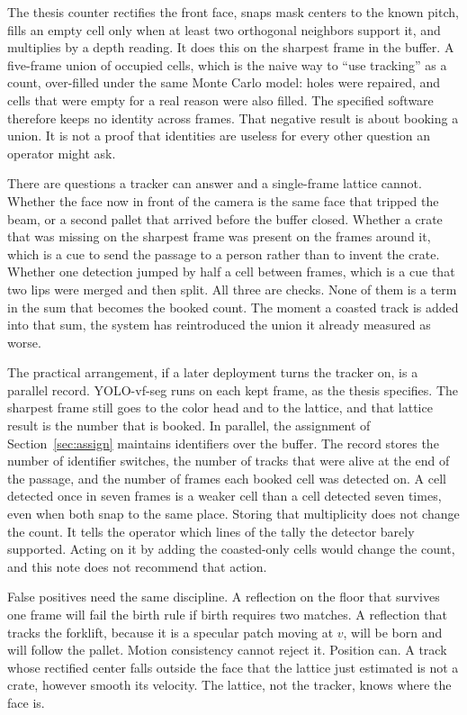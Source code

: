\documentclass[11pt,a4paper]{article}
\begin{document}
The thesis counter rectifies the front face, snaps mask centers to the known pitch, fills an empty cell only when at least two orthogonal neighbors support it, and multiplies by a depth reading. It does this on the sharpest frame in the buffer. A five-frame union of occupied cells, which is the naive way to ``use tracking'' as a count, over-filled under the same Monte Carlo model: holes were repaired, and cells that were empty for a real reason were also filled. The specified software therefore keeps no identity across frames. That negative result is about booking a union. It is not a proof that identities are useless for every other question an operator might ask.

There are questions a tracker can answer and a single-frame lattice cannot. Whether the face now in front of the camera is the same face that tripped the beam, or a second pallet that arrived before the buffer closed. Whether a crate that was missing on the sharpest frame was present on the frames around it, which is a cue to send the passage to a person rather than to invent the crate. Whether one detection jumped by half a cell between frames, which is a cue that two lips were merged and then split. All three are checks. None of them is a term in the sum that becomes the booked count. The moment a coasted track is added into that sum, the system has reintroduced the union it already measured as worse.

The practical arrangement, if a later deployment turns the tracker on, is a parallel record. YOLO-vf-seg runs on each kept frame, as the thesis specifies. The sharpest frame still goes to the color head and to the lattice, and that lattice result is the number that is booked. In parallel, the assignment of Section~\ref{sec:assign} maintains identifiers over the buffer. The record stores the number of identifier switches, the number of tracks that were alive at the end of the passage, and the number of frames each booked cell was detected on. A cell detected once in seven frames is a weaker cell than a cell detected seven times, even when both snap to the same place. Storing that multiplicity does not change the count. It tells the operator which lines of the tally the detector barely supported. Acting on it by adding the coasted-only cells would change the count, and this note does not recommend that action.

False positives need the same discipline. A reflection on the floor that survives one frame will fail the birth rule if birth requires two matches. A reflection that tracks the forklift, because it is a specular patch moving at $v$, will be born and will follow the pallet. Motion consistency cannot reject it. Position can. A track whose rectified center falls outside the face that the lattice just estimated is not a crate, however smooth its velocity. The lattice, not the tracker, knows where the face is.
\end{document}
